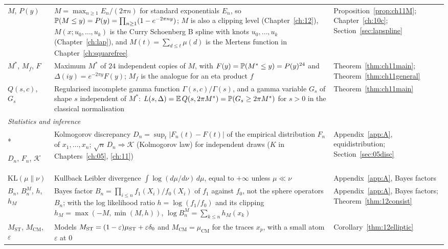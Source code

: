{\begin{longtable}{p{0.8in}p{2.65in}p{0.95in}}
\raggedright $M$, $P(y)$ & \raggedright $M=\max_{n\ge1}E_n/(2\pi n)$ for standard exponentials $E_n$, so $\mathbb{P}(M\le y)=P(y)=\prod_{n\ge1}(1-e^{-2\pi ny})$; $M$ is also a clipping level (Chapter~\ref{ch:12}), $M(x;u_0,\dots,u_k)$ is the Curry Schoenberg B spline with knots $u_0,\dots,u_k$ (Chapter~\ref{ch:lap}), and $M(t)=\sum_{d\le t}\mu(d)$ is the Mertens function in Chapter~\ref{ch:squarefree} & \raggedright Proposition~\ref{prop:ch11M}; Chapter~\ref{ch:10c}; Section~\ref{sec:lapspline}\tabularnewline[1pt]
\raggedright $M^*$, $M_f$, $F$ & \raggedright Maximum $M^*$ of $24$ independent copies of $M$, with $F(y)=\mathbb{P}(M^*\le y)=P(y)^{24}$ and $\Delta(iy)=e^{-2\pi y}F(y)$; $M_f$ is the analogue for an eta product $f$ & \raggedright Theorem~\ref{thm:ch11main}; Theorem~\ref{thm:ch11general}\tabularnewline[1pt]
\raggedright $Q(s,c)$, $G_s$ & \raggedright Regularised incomplete gamma function $\Gamma(s,c)/\Gamma(s)$, and a gamma variable $G_s$ of shape $s$ independent of $M^*$: $L(s,\Delta)=\mathbb{E}\,Q(s,2\pi M^*)=\mathbb{P}(G_s\ge2\pi M^*)$ for $s>0$ in the classical normalisation & \raggedright Theorem~\ref{thm:ch11main}\tabularnewline[1pt]
\midrule
\multicolumn{3}{l}{\textit{Statistics and inference}}\\*
\raggedright $D_n$, $F_n$, $\mathcal K$ & \raggedright Kolmogorov discrepancy $D_n=\sup_t|F_n(t)-F(t)|$ of the empirical distribution $F_n$ of $x_1,\dots,x_n$; $\sqrt n\,D_n\Rightarrow\mathcal K$ (Kolmogorov law) for independent draws ($K$ in Chapters~\ref{ch:05}, \ref{ch:11}) & \raggedright Appendix~\ref{app:A}, equidistribution; Section~\ref{sec:05disc}\tabularnewline[1pt]
\raggedright $\mathrm{KL}(\mu\|\nu)$ & \raggedright Kullback Leibler divergence $\int\log(d\mu/d\nu)\,d\mu$, equal to $+\infty$ unless $\mu\ll\nu$ & \raggedright Appendix~\ref{app:A}, Bayes factors\tabularnewline[1pt]
\raggedright $B_n$, $B_n^M$, $h$, $h_M$ & \raggedright Bayes factor $B_n=\prod_{i\le n}f_1(X_i)/f_0(X_i)$ of $f_1$ against $f_0$, not the sphere operators $B_n$; with the log likelihood ratio $h=\log(f_1/f_0)$ and its clipping $h_M=\max(-M,\min(M,h))$, $\log B_n^M=\sum_{k\le n}h_M(x_k)$ & \raggedright Appendix~\ref{app:A}, Bayes factors; Theorem~\ref{thm:12consist}\tabularnewline[1pt]
\raggedright $M_{\mathrm{ST}}$, $M_{\mathrm{CM}}$, $\varepsilon$ & \raggedright Models $M_{\mathrm{ST}}=(1-\varepsilon)\mu_{\mathrm{ST}}+\varepsilon\delta_0$ and $M_{\mathrm{CM}}=\mu_{\mathrm{CM}}$ for the traces $x_p$, with a small atom $\varepsilon$ at $0$ & \raggedright Corollary~\ref{thm:12elliptic}\tabularnewline[1pt]
\bottomrule
\end{longtable}}

